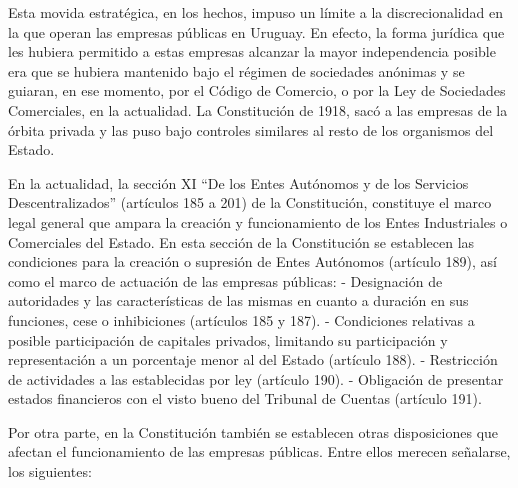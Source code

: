 \documentclass[
  12pt,
  spanish,
]{book}
\begin{document}
Esta movida estratégica, en los hechos, impuso un límite a la discrecionalidad en la que operan las empresas públicas en Uruguay. En efecto, la forma jurídica que les hubiera permitido a estas empresas alcanzar la mayor independencia posible era que se hubiera mantenido bajo el régimen de sociedades anónimas y se guiaran, en ese momento, por el Código de Comercio, o por la Ley de Sociedades Comerciales, en la actualidad. La Constitución de 1918, sacó a las empresas de la órbita privada y las puso bajo controles similares al resto de los organismos del Estado.

En la actualidad, la sección XI ``De los Entes Autónomos y de los Servicios Descentralizados'' (artículos 185 a 201) de la Constitución, constituye el marco legal general que ampara la creación y funcionamiento de los Entes Industriales o Comerciales del Estado. En esta sección de la Constitución se establecen las condiciones para la creación o supresión de Entes Autónomos (artículo 189), así como el marco de actuación de las empresas públicas:
- Designación de autoridades y las características de las mismas en cuanto a duración en sus funciones, cese o inhibiciones (artículos 185 y 187).
- Condiciones relativas a posible participación de capitales privados, limitando su participación y representación a un porcentaje menor al del Estado (artículo 188).
- Restricción de actividades a las establecidas por ley (artículo 190).
- Obligación de presentar estados financieros con el visto bueno del Tribunal de Cuentas (artículo 191).

Por otra parte, en la Constitución también se establecen otras disposiciones que afectan el funcionamiento de las empresas públicas. Entre ellos merecen señalarse, los siguientes:
\end{document}
